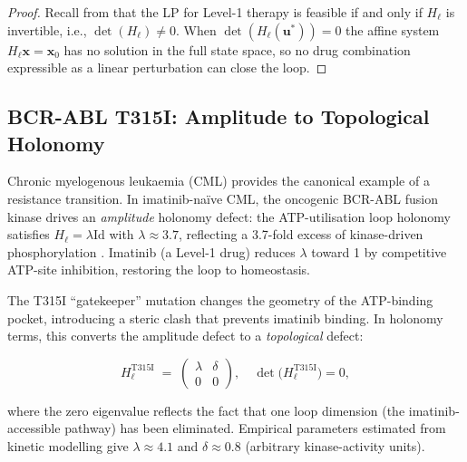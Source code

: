 \begin{proof}
Recall from  that the LP for Level-1 therapy is
feasible if and only if $H_\ell$ is invertible, i.e., $\det(H_\ell) \neq 0$.
When $\det(H_\ell(\mathbf{u}^*)) = 0$ the affine system $H_\ell \mathbf{x} = \mathbf{x}_0$
has no solution in the full state space, so no drug combination expressible as a
linear perturbation can close the loop.
\end{proof}

\subsection{BCR-ABL T315I: Amplitude to Topological Holonomy}

Chronic myelogenous leukaemia (CML) provides the canonical example of a
resistance transition.  In imatinib-na\"{i}ve CML, the oncogenic BCR-ABL fusion
kinase drives an \emph{amplitude} holonomy defect: the ATP-utilisation loop
holonomy satisfies $H_\ell = \lambda \mathrm{Id}$ with $\lambda \approx 3.7$,
reflecting a 3.7-fold excess of kinase-driven phosphorylation
\citep{Druker2001}.  Imatinib (a Level-1 drug) reduces $\lambda$ toward 1 by
competitive ATP-site inhibition, restoring the loop to homeostasis.

The T315I ``gatekeeper'' mutation changes the geometry of the ATP-binding
pocket, introducing a steric clash that prevents imatinib binding.  In holonomy
terms, this converts the amplitude defect to a \emph{topological} defect:

\begin{equation}
  \label{eq:ch10-t315i-holonomy}
  H_\ell^{\mathrm{T315I}} \;=\;
  \begin{pmatrix} \lambda & \delta \\ 0 & 0 \end{pmatrix},
  \quad \det\!\bigl(H_\ell^{\mathrm{T315I}}\bigr) = 0,
\end{equation}

\noindent where the zero eigenvalue reflects the fact that one loop dimension
(the imatinib-accessible pathway) has been eliminated.  Empirical parameters
estimated from kinetic modelling \citep{Shah2007} give $\lambda \approx 4.1$
and $\delta \approx 0.8$ (arbitrary kinase-activity units).

